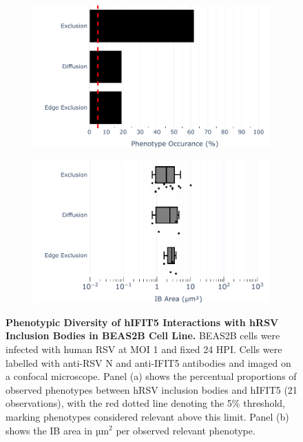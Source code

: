 \begin{figure}
    \begin{subfigure}{0.495\textwidth}
        \caption{}
        \includegraphics[width=1\linewidth]{08. Chapter 3/Figs/02. Infection/04. IFIT5/04. bar_i5_beas2b.pdf}
    \end{subfigure}
    \begin{subfigure}{0.495\textwidth}
        \caption{}
        \includegraphics[width=1\linewidth]{08. Chapter 3/Figs/02. Infection/04. IFIT5/05. box_i5_beas2b.pdf}
    \end{subfigure}
    \caption[Phenotypic Diversity of hIFIT5 Interactions with hRSV Inclusion Bodies in BEAS2B Cell Line.]{\textbf{Phenotypic Diversity of hIFIT5 Interactions with hRSV Inclusion Bodies in BEAS2B Cell Line.} BEAS2B cells were infected with human RSV at MOI 1 and fixed 24 HPI. Cells were labelled with anti-RSV N and anti-IFIT5 antibodies and imaged on a confocal microscope. Panel (a) shows the percentual proportions of observed phenotypes between hRSV inclusion bodies and hIFIT5 (21 observations), with the red dotted line denoting the 5\% threshold, marking phenotypes considered relevant above this limit. Panel (b) shows the IB area in \(\mbox{µm}^2\) per observed relevant phenotype.}
    \label{fig:Phenotypic Diversity of hIFIT5 Interactions with hRSV Inclusion Bodies in BEAS2B Cell Line}
\end{figure}

